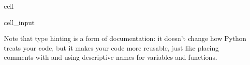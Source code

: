 \documentclass[letterpaper,10pt,english]{jupyterBook}
\begin{document}
\begin{sphinxuseclass}{cell}\begin{sphinxVerbatimInput}

\begin{sphinxuseclass}{cell_input}
\begin{sphinxVerbatim}[commandchars=\\\{\}]
    
       
       
\end{sphinxVerbatim}

\end{sphinxuseclass}\end{sphinxVerbatimInput}

\end{sphinxuseclass}
\sphinxAtStartPar
Note that type hinting is a form of documentation: it doesn’t change how Python treats your code, but it makes your code more reusable, just like placing comments with \sphinxcode{\sphinxupquote{\#}} and using descriptive names for variables and functions.
\end{document}
